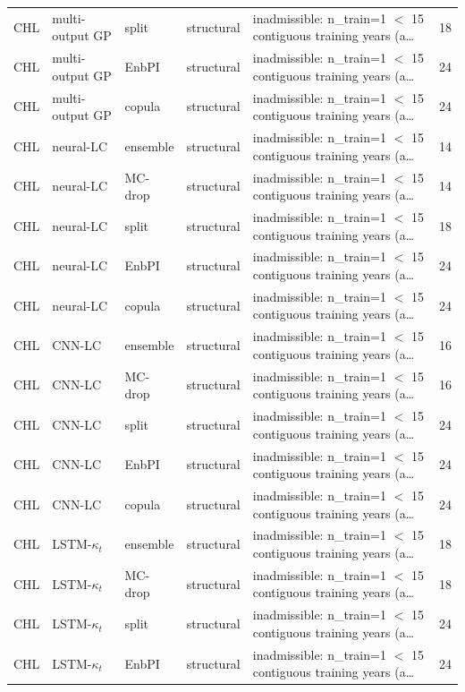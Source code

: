 {\begin{longtable}{@{}lllp{1.6cm}p{6.2cm}r@{}}
CHL & multi-output GP & split & structural & inadmissible: n\_train=1 $<$ 15 contiguous training years (a\ldots & 18 \\
CHL & multi-output GP & EnbPI & structural & inadmissible: n\_train=1 $<$ 15 contiguous training years (a\ldots & 24 \\
CHL & multi-output GP & copula & structural & inadmissible: n\_train=1 $<$ 15 contiguous training years (a\ldots & 24 \\
CHL & neural-LC & ensemble & structural & inadmissible: n\_train=1 $<$ 15 contiguous training years (a\ldots & 14 \\
CHL & neural-LC & MC-drop & structural & inadmissible: n\_train=1 $<$ 15 contiguous training years (a\ldots & 14 \\
CHL & neural-LC & split & structural & inadmissible: n\_train=1 $<$ 15 contiguous training years (a\ldots & 18 \\
CHL & neural-LC & EnbPI & structural & inadmissible: n\_train=1 $<$ 15 contiguous training years (a\ldots & 24 \\
CHL & neural-LC & copula & structural & inadmissible: n\_train=1 $<$ 15 contiguous training years (a\ldots & 24 \\
CHL & CNN-LC & ensemble & structural & inadmissible: n\_train=1 $<$ 15 contiguous training years (a\ldots & 16 \\
CHL & CNN-LC & MC-drop & structural & inadmissible: n\_train=1 $<$ 15 contiguous training years (a\ldots & 16 \\
CHL & CNN-LC & split & structural & inadmissible: n\_train=1 $<$ 15 contiguous training years (a\ldots & 24 \\
CHL & CNN-LC & EnbPI & structural & inadmissible: n\_train=1 $<$ 15 contiguous training years (a\ldots & 24 \\
CHL & CNN-LC & copula & structural & inadmissible: n\_train=1 $<$ 15 contiguous training years (a\ldots & 24 \\
CHL & LSTM-$\kappa_t$ & ensemble & structural & inadmissible: n\_train=1 $<$ 15 contiguous training years (a\ldots & 18 \\
CHL & LSTM-$\kappa_t$ & MC-drop & structural & inadmissible: n\_train=1 $<$ 15 contiguous training years (a\ldots & 18 \\
CHL & LSTM-$\kappa_t$ & split & structural & inadmissible: n\_train=1 $<$ 15 contiguous training years (a\ldots & 24 \\
CHL & LSTM-$\kappa_t$ & EnbPI & structural & inadmissible: n\_train=1 $<$ 15 contiguous training years (a\ldots & 24 \\

\end{longtable}}
